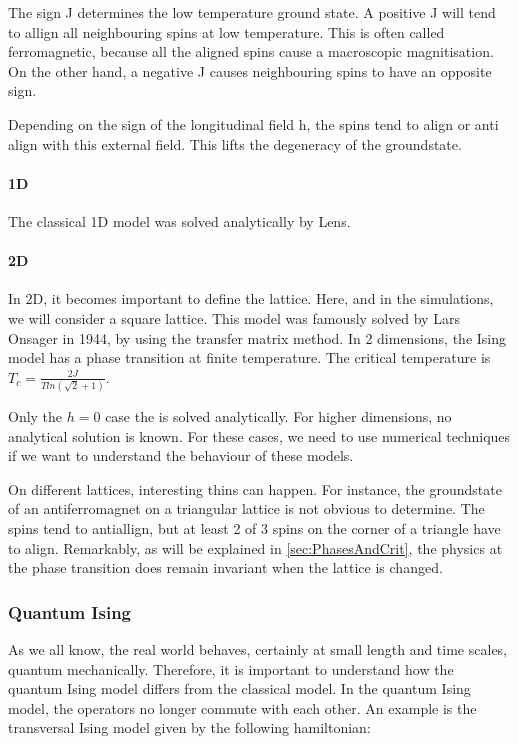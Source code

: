 The sign J determines the low temperature ground state. A positive J will tend to allign all neighbouring spins at low temperature. This is often called ferromagnetic, because all the aligned spins cause a macroscopic magnitisation. On the other hand, a negative J causes neighbouring spins to have an opposite sign.

Depending on the sign of the longitudinal field h, the spins tend to align or anti align with this external field. This lifts the degeneracy of the groundstate.

\paragraph{1D}

The classical 1D model was solved analytically by Lens. 

\paragraph{2D}

In 2D, it becomes important to define the lattice. Here, and in the simulations, we will consider a square lattice. This model was famously solved by Lars Onsager in 1944, by using the transfer matrix method. In 2 dimensions, the Ising model has a phase transition at finite temperature. The critical temperature is $T_c = \frac{2 J}{T ln( \sqrt{2}+1)}$.

Only the $h=0$ case the is solved analytically. For higher dimensions, no analytical solution is known. For these cases, we need to use numerical techniques if we want to understand the behaviour of these models.

On different lattices, interesting thins can happen. For instance, the groundstate of an antiferromagnet on a triangular lattice is not obvious to determine. The spins tend to antiallign, but at least 2 of 3 spins on the corner of a triangle have to align. Remarkably, as will be explained in \cref{sec:PhasesAndCrit}, the physics at the phase transition does remain invariant when the lattice is changed.

\subsubsection{Quantum Ising}

As we all know, the real world behaves, certainly at small length and time scales, quantum mechanically. Therefore, it is important to understand how the quantum Ising model differs from the classical model. In the quantum Ising model, the operators no longer commute with each other. An example is the transversal Ising model given by the following hamiltonian:

